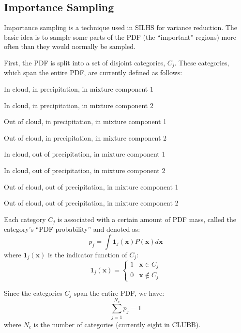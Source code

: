 \documentclass[11pt,fleqn]{article}
\begin{document}
\subsection{Importance Sampling}

Importance sampling is a technique used in SILHS for variance reduction. The
basic idea is to sample some parts of the PDF (the ``important'' regions) more
often than they would normally be sampled.

First, the PDF is split into a set of disjoint categories, $C_j$. These
categories, which span the entire PDF, are currently defined as follows:
\begin{enumerate*}
\item In cloud, in precipitation, in mixture component 1
\item In cloud, in precipitation, in mixture component 2
\item Out of cloud, in precipitation, in mixture component 1
\item Out of cloud, in precipitation, in mixture component 2
\item In cloud, out of precipitation, in mixture component 1
\item In cloud, out of precipitation, in mixture component 2
\item Out of cloud, out of precipitation, in mixture component 1
\item Out of cloud, out of precipitation, in mixture component 2
\end{enumerate*}

Each category $C_j$ is associated with a certain amount of PDF mass, called the
category's ``PDF probability'' and denoted as:
\begin{equation}
p_j = \int \mathbf{1}_j(\mathbf{x}) P(\mathbf{x}) d\mathbf{x}
\end{equation}
where $\mathbf{1}_j(\mathbf{x})$ is the indicator function of $C_j$:
\begin{equation}
\mathbf{1}_j(\mathbf{x}) =
\begin{cases}
1 & \mathbf{x} \in C_j \\
0 & \mathbf{x} \notin C_j
\end{cases}
\end{equation}

Since the categories $C_j$ span the entire PDF, we have:
\begin{equation}
\sum_{j=1}^{N_c} p_j = 1
\end{equation}
where $N_c$ is the number of categories (currently eight in CLUBB).
\end{document}
